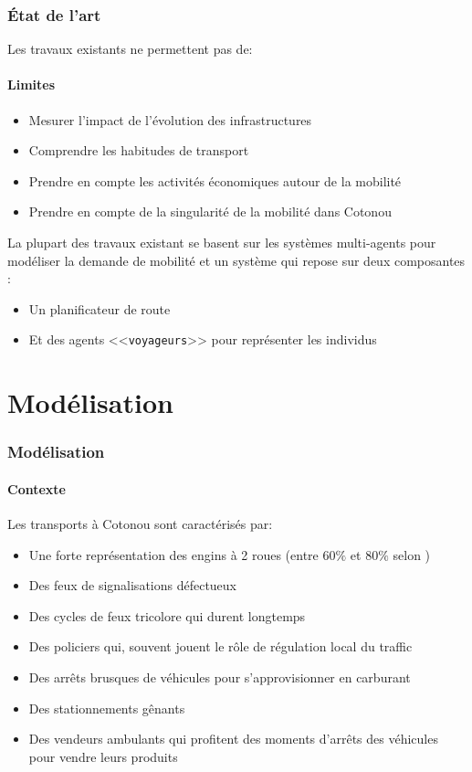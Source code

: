 \begin{frame}
    \frametitle{État de l'art}
    Les travaux existants ne permettent pas de:
    \framesubtitle{Limites}
    \begin{itemize}
        \item {} Mesurer l'impact de l'évolution des infrastructures
        \item {} Comprendre les habitudes de transport
        \item {} Prendre en compte les activités économiques autour de la mobilité
        \item {} Prendre en compte de la singularité de la mobilité dans Cotonou
    \end{itemize}

    \pause{}
    La plupart des travaux existant se basent sur les systèmes multi-agents pour modéliser la demande de mobilité et un système qui repose sur deux composantes :
    \begin{itemize}
        \item Un planificateur de route
        \item Et des agents <<\texttt{voyageurs}>> pour représenter les individus
    \end{itemize}
\end{frame}


\section{Modélisation}\label{modelisation}

\begin{frame}
    \frametitle{Modélisation}
    \framesubtitle{Contexte}
    Les transports à Cotonou sont caractérisés par:
    \begin{itemize}
        \item Une forte représentation des engins à 2 roues (entre $60\%$ et $80\%$ selon \textcite{briod2011zemidjan})
        \item Des feux de signalisations défectueux
        \item Des cycles de feux tricolore qui durent longtemps
        \item Des policiers qui, souvent jouent le rôle de régulation local du traffic
        \item Des arrêts brusques de véhicules pour s'approvisionner en carburant
        \item Des stationnements gênants
        \item Des vendeurs ambulants qui profitent des moments d'arrêts des véhicules pour vendre leurs produits
    \end{itemize}

\end{frame}

